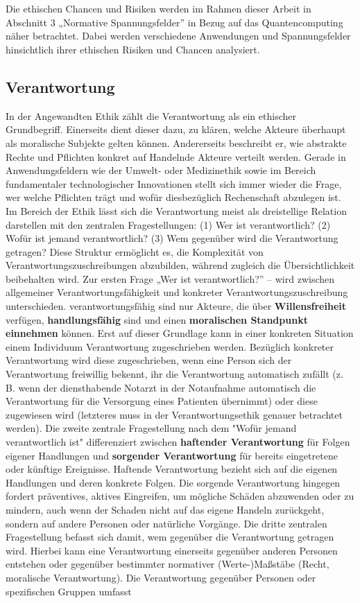 \\
\\
Die ethischen Chancen und Risiken werden im Rahmen dieser Arbeit in Abschnitt 3 „Normative Spannungsfelder” in Bezug auf das Quantencomputing näher betrachtet. Dabei werden verschiedene Anwendungen und Spannungsfelder hinsichtlich ihrer ethischen Risiken und Chancen analysiert.


\subsection{Verantwortung}
In der Angewandten Ethik zählt die Verantwortung als ein ethischer Grundbegriff. Einerseits dient dieser dazu, zu klären, welche Akteure überhaupt als moralische Subjekte gelten können. Andererseits beschreibt er, wie abstrakte Rechte und Pflichten konkret auf Handelnde Akteure verteilt werden. Gerade in Anwendungsfeldern wie der Umwelt- oder Medizinethik sowie im Bereich fundamentaler technologischer Innovationen stellt sich immer wieder die Frage, wer welche Pflichten trägt und wofür diesbezüglich Rechenschaft abzulegen ist. Im Bereich der Ethik lässt sich die Verantwortung meist als dreistellige Relation darstellen mit den zentralen Fragestellungen: (1) Wer ist verantwortlich? (2) Wofür ist jemand verantwortlich? (3) Wem gegenüber wird die Verantwortung getragen? Diese Struktur ermöglicht es, die Komplexität von Verantwortungszuschreibungen abzubilden, während zugleich die Übersichtlichkeit beibehalten wird. Zur ersten Frage „Wer ist verantwortlich?” – wird zwischen allgemeiner Verantwortungsfähigkeit und konkreter Verantwortungszuschreibung unterschieden. verantwortungsfähig sind nur Akteure, die über \textbf{Willensfreiheit} verfügen, \textbf{handlungsfähig} sind und einen \textbf{moralischen Standpunkt einnehmen} können. Erst auf dieser Grundlage kann in einer konkreten Situation einem Individuum Verantwortung zugeschrieben werden. Bezüglich konkreter Verantwortung wird diese zugeschrieben, wenn eine Person sich der Verantwortung freiwillig bekennt, ihr die Verantwortung automatisch zufällt (z. B. wenn der diensthabende Notarzt in der Notaufnahme automatisch die Verantwortung für die Versorgung eines Patienten übernimmt) oder diese zugewiesen wird (letzteres muss in der Verantwortungsethik genauer betrachtet werden). Die zweite zentrale Fragestellung nach dem "Wofür jemand verantwortlich ist" differenziert zwischen \textbf{haftender Verantwortung} für Folgen eigener Handlungen und \textbf{sorgender Verantwortung} für bereits eingetretene oder künftige Ereignisse. Haftende Verantwortung bezieht sich auf die eigenen Handlungen und deren konkrete Folgen. Die sorgende Verantwortung hingegen fordert präventives, aktives Eingreifen, um mögliche Schäden abzuwenden oder zu mindern, auch wenn der Schaden nicht auf das eigene Handeln zurückgeht, sondern auf andere Personen oder natürliche Vorgänge. Die dritte zentralen Fragestellung befasst sich damit, wem gegenüber die Verantwortung getragen wird. Hierbei kann eine Verantwortung einerseits gegenüber anderen Personen entstehen oder gegenüber bestimmter normativer (Werte-)Maßstäbe (Recht, moralische Verantwortung). Die Verantwortung gegenüber Personen oder spezifischen Gruppen umfasst 